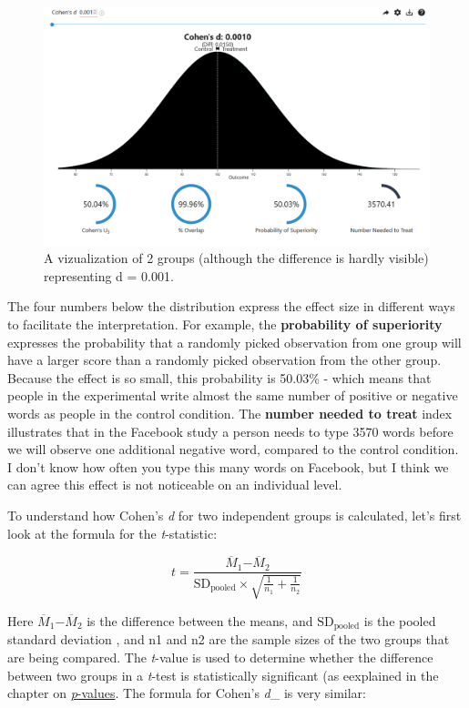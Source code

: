 \documentclass[
  oneside]{book}
\begin{document}
\begin{figure}

{\centering \includegraphics[width=1\linewidth]{images/rpsychd1} 

}

\caption{A vizualization of 2 groups (although the difference is hardly visible) representing d = 0.001.}\label{fig:rpsychd1}
\end{figure}

The four numbers below the distribution express the effect size in different ways to facilitate the interpretation. For example, the \textbf{probability of superiority} expresses the probability that a randomly picked observation from one group will have a larger score than a randomly picked observation from the other group. Because the effect is so small, this probability is 50.03\% - which means that people in the experimental write almost the same number of positive or negative words as people in the control condition. The \textbf{number needed to treat} index illustrates that in the Facebook study a person needs to type 3570 words before we will observe one additional negative word, compared to the control condition. I don't know how often you type this many words on Facebook, but I think we can agree this effect is not noticeable on an individual level.

To understand how Cohen's \emph{d} for two independent groups is calculated, let's first look at the formula for the \emph{t}-statistic:

\[
t = \frac{{\overline{M}}_{1}{- \overline{M}}_{2}}{\text{SD}_{\text{pooled}} \times \sqrt{\frac{1}{n_{1}} + \frac{1}{n_{2}}}}
\]

Here \({\overline{M}}_{1}{- \overline{M}}_{2}\) is the difference between the means, and \(\text{SD}_{\text{pooled}}\) is the pooled standard deviation \citep{lakens_calculating_2013}, and n1 and n2 are the sample sizes of the two groups that are being compared. The \emph{t}-value is used to determine whether the difference between two groups in a \emph{t}-test is statistically significant (as eexplained in the chapter on \protect\hyperlink{pvalue}{\emph{p}-values}. The formula for Cohen's \emph{d}\_ is very similar:
\end{document}
